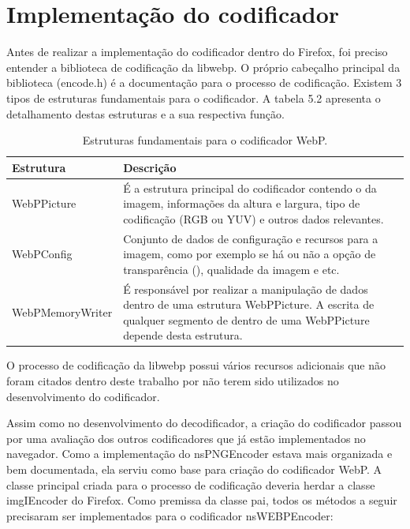 \documentclass[espaco=simples,appendix=Name]{abnt}
\begin{document}
\section{Implementação do codificador}

Antes de realizar a implementação do codificador dentro do Firefox, foi preciso entender a biblioteca de codificação da libwebp. O próprio cabeçalho principal da biblioteca (encode.h) é a documentação para o processo de codificação. Existem 3 tipos de estruturas fundamentais para o codificador. A tabela 5.2 apresenta o detalhamento destas estruturas e a sua respectiva função.

\begin{table}[ht]
        \centering
        \caption{Estruturas fundamentais para o codificador WebP.
        \label{tbl:padc}}{
                \vspace{0.3cm}
                \begin{tabular}{|l|p{10cm}|}
                \hline
                        \textbf{Estrutura} & \textbf{Descrição} \\
                        \hline
                        WebPPicture		& É a estrutura principal do codificador contendo o \ingles{buffer} da imagem, informações da altura e largura, tipo de codificação (RGB ou YUV) e outros dados relevantes. \\
                        \hline
                        WebPConfig		& Conjunto de dados de configuração e recursos para a imagem, como por exemplo se há ou não a opção de transparência (\ingles{alpha}), qualidade da imagem e etc.  \\
                        \hline
                        WebPMemoryWriter	& É responsável por realizar a manipulação de dados dentro de uma estrutura WebPPicture. A escrita de qualquer segmento de \ingles{buffer} dentro de uma WebPPicture depende desta estrutura. \\
                        \hline
                \end{tabular}
                }
\end{table}

O processo de codificação da libwebp possui vários recursos adicionais que não foram citados dentro deste trabalho por não terem sido utilizados no desenvolvimento do codificador.

Assim como no desenvolvimento do decodificador, a criação do codificador passou por uma avaliação dos outros codificadores que já estão implementados no navegador. Como a implementação do nsPNGEncoder estava mais organizada e bem documentada, ela serviu como base para criação do codificador WebP. A classe principal criada para o processo de codificação deveria herdar a classe imgIEncoder do Firefox. Como premissa da classe pai, todos os métodos a seguir precisaram ser implementados para o codificador nsWEBPEncoder:
\end{document}
